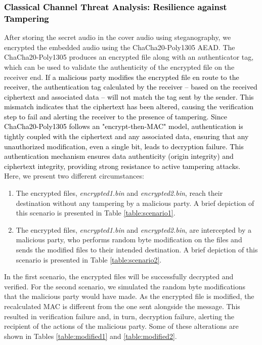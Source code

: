 \documentclass[a4paper]{cas-sc}
\begin{document}
\subsubsection{\textcolor{black}{Classical Channel Threat Analysis: Resilience against Tampering}}
After storing the secret audio in the cover audio using steganography, we encrypted the embedded audio using the ChaCha20-Poly1305 AEAD. The ChaCha20-Poly1305 produces an encrypted file along with an authenticator tag, which can be used to validate the authenticity of the encrypted file on the receiver end. \textcolor{black}{If a malicious party modifies the encrypted file en route to the receiver, the authentication tag calculated by the receiver -- based on the received ciphertext and associated data -- will not match the tag sent by the sender. This mismatch indicates that the ciphertext has been altered, causing the verification step to fail and alerting the receiver to the presence of tampering. Since ChaCha20-Poly1305 follows an "encrypt-then-MAC" model, authentication is tightly coupled with the ciphertext and any associated data, ensuring that any unauthorized modification, even a single bit, leads to decryption failure. This authentication mechanism ensures data authenticity (origin integrity) and ciphertext integrity, providing strong resistance to active tampering attacks.} Here, we present two different circumstances:
\begin{enumerate}
    \item The encrypted files, \textit{encrypted1.bin} and \textit{encrypted2.bin}, reach their destination without any tampering by a malicious party. A brief depiction of this scenario is presented in Table \ref{table:scenario1}.
    \item The encrypted files, \textit{encrypted1.bin} and \textit{encrypted2.bin}, are intercepted by a malicious party, who performs random byte modification on the files and sends the modified files to their intended destination. A brief depiction of this scenario is presented in Table \ref{table:scenario2}.
\end{enumerate}

In the first scenario, the encrypted files will be successfully decrypted and verified. For the second scenario, we simulated the random byte modifications that the malicious party would have made. As the encrypted file is modified, the recalculated MAC is different from the one sent alongside the message. This resulted in verification failure and, in turn, decryption failure, alerting the recipient of the actions of the malicious party. Some of these alterations are shown in Tables \ref{table:modified1} and \ref{table:modified2}.
\end{document}
